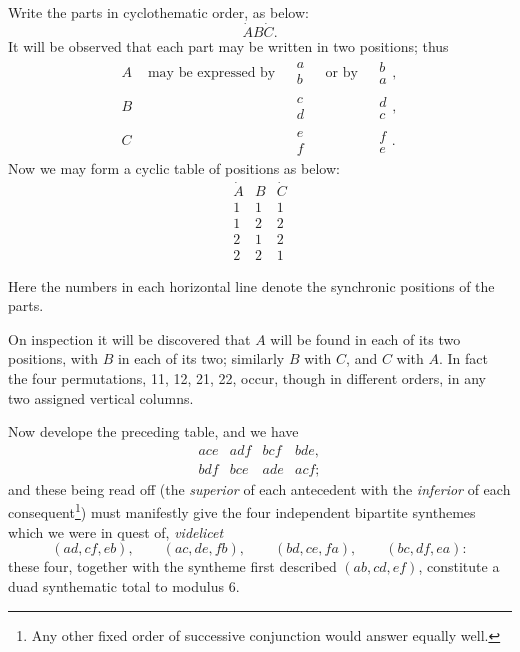 \documentclass[11pt]{article}
\newcommand{\sourcepage}[1]{\marginpar{\scriptsize p.~#1}}
\newcommand{\dotter}[1]{\dot{#1}}
\begin{document}
{{Write the parts in cyclothematic order, as below:
\[
\dotter A B\dotter C.
\]
It will be observed that each part may be written in two positions; thus
\[
\begin{array}{rclcccl}
A&\text{ may be expressed by }&\begin{matrix}a\\ b\end{matrix}&\text{ or by }&\begin{matrix}b\\ a\end{matrix},\\[0.7em]
B&&\begin{matrix}c\\ d\end{matrix}&&\begin{matrix}d\\ c\end{matrix},\\[0.7em]
C&&\begin{matrix}e\\ f\end{matrix}&&\begin{matrix}f\\ e\end{matrix}.
\end{array}
\]
Now we may form a cyclic table of positions as below:
\[
\begin{array}{ccc}
\dotter A& B& \dotter C\\ \hline
1&1&1\\
1&2&2\\
2&1&2\\
2&2&1
\end{array}
\]

\sourcepage{95}
Here the numbers in each horizontal line denote the synchronic positions of the parts.

On inspection it will be discovered that $A$ will be found in each of its two positions, with $B$ in each of its two; similarly $B$ with $C$, and $C$ with $A$. In fact the four permutations, 11, 12, 21, 22, occur, though in different orders, in any two assigned vertical columns.

Now develope the preceding table, and we have
\[
\begin{array}{llll}
ace&adf&bcf&bde,\\
bdf&bce&ade&acf;
\end{array}
\]
and these being read off (the \emph{superior} of each antecedent with the \emph{inferior} of each consequent\footnote{Any other fixed order of successive conjunction would answer equally well.}) must manifestly give the four independent bipartite synthemes which we were in quest of, \emph{videlicet}
\[
(ad,cf,eb),\qquad (ac,de,fb),\qquad (bd,ce,fa),\qquad (bc,df,ea):
\]
these four, together with the syntheme first described $(ab,cd,ef)$, constitute a duad synthematic total to modulus 6.

}}
\end{document}
